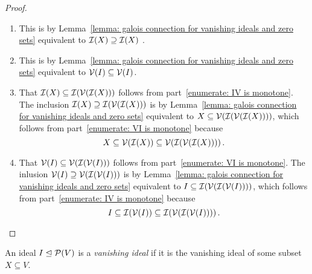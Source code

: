 \begin{proof}
  \leavevmode
  \begin{enumerate}
    \item
      This is by Lemma~\ref{lemma: galois connection for vanishing ideals and zero sets} equivalent to $\mathcal{I}(X) \supseteq \mathcal{I}(X)$ .
    \item
      This is by Lemma~\ref{lemma: galois connection for vanishing ideals and zero sets} equivalent to $\mathcal{V}(I) \subseteq \mathcal{V}(I)$.
    \item
      That $\mathcal{I}(X) \subseteq \mathcal{I}(\mathcal{V}(\mathcal{I}(X)))$ follows from part~\ref*{enumerate: IV is monotone}.
      The inclusion $\mathcal{I}(X) \supseteq \mathcal{I}(\mathcal{V}(\mathcal{I}(X)))$ is by Lemma~\ref{lemma: galois connection for vanishing ideals and zero sets} equivalent to $X \subseteq \mathcal{V}(\mathcal{I}(\mathcal{V}(\mathcal{I}(X))))$, which follows from part~\ref*{enumerate: VI is monotone} because
      \[
                  X
        \subseteq \mathcal{V}(\mathcal{I}(X))
        \subseteq \mathcal{V}(\mathcal{I}(\mathcal{V}(\mathcal{I}(X)))) \,.
      \]
    \item
      That $\mathcal{V}(I) \subseteq \mathcal{V}(\mathcal{I}(\mathcal{V}(I)))$ follows from part~\ref*{enumerate: VI is monotone}.
      The inlusion $\mathcal{V}(I) \supseteq \mathcal{V}(\mathcal{I}(\mathcal{V}(I)))$ is by Lemma~\ref{lemma: galois connection for vanishing ideals and zero sets} equivalent to $I \subseteq \mathcal{I}(\mathcal{V}(\mathcal{I}(\mathcal{V}(I))))$, which follows from part~\ref*{enumerate: IV is monotone} because
      \[
                  I
        \subseteq \mathcal{I}(\mathcal{V}(I))
        \subseteq \mathcal{I}(\mathcal{V}(\mathcal{I}(\mathcal{V}(I)))) \,.
        \qedhere
      \]
  \end{enumerate}
\end{proof}


\begin{definition}
  An ideal $I \trianglelefteq \mathcal{P}(V)$ is a \emph{vanishing ideal} if it is the vanishing ideal of some subset $X \subseteq V$.
\end{definition}


